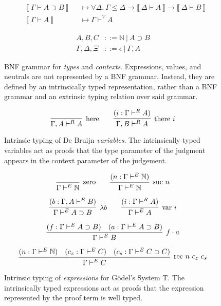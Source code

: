\documentclass[preprint,nonatbib]{sigplanconf}
\numberwithin{mysubdfn}{mydfn}
\def\dfn{\mapsto}
\def\arr{\supset}
\def\marr{\rightarrow}
\def\app{\cdot}
\def\lam{\lambda}
\def\nat{\mathbb{N}}
\newcommand{\el}[1]{\llbracket ~ #1 ~ \rrbracket}
\newcommand{\con}[1]{\textmd{#1}}
\newcommand{\fun}[1]{\textmd{#1}}
\newcommand{\typm}[1]{\el{\Gamma \vdash #1}}
\newcommand{\dtypm}[1]{\el{\Delta \vdash #1}}
\newcommand{\type}[1]{\Gamma \vdash^E #1}
\newcommand{\ctype}[2]{\Gamma , #1 \vdash^E #2}
\newcommand{\typv}[1]{\Gamma \vdash^V #1}
\newcommand{\dtypv}[1]{\Delta \vdash^V #1}
\newcommand{\typr}[1]{\Gamma \vdash^R #1}
\newcommand{\ctypr}[2]{\Gamma , #1 \vdash^R #2}
\newcommand{\ren}[1]{\Gamma \le #1}
\def\dren{\ren{\Delta}}
\newcommand{\env}[1]{\Gamma \sqsubseteq #1}
\def\denv{\env{\Delta}}
\begin{document}
\begin{align*}
&\typm{A \arr B}& &\dfn \forall \Delta.~ \dren \marr \dtypm{A} \marr \dtypm{B} \\
&\typm{A}& &\dfn \typv{A}
\end{align*}






\begin{figure}
\caption{
BNF grammar for {\it types} and {\it contexts}. 
Expressions, values, and neutrals
are not represented by a BNF grammar. Instead, they are defined by
an intrinsically typed representation, rather than a BNF grammar and
an extrinsic typing relation over said grammar.
}
\begin{align*}
A, B, C &::= \nat ~ | ~ A \arr B \\
\Gamma, \Delta, \Xi &::= \epsilon ~ | ~ \Gamma , A
\end{align*}
\label{fig:gram}
\end{figure}

\begin{figure}
\caption{
Intrinsic typing of De Bruijn {\it variables}.
The intrinsically typed variables act as proofs that the type
parameter of the judgment appears in the context parameter of the
judgement.
}
$$
\infer
  [\con{here}]
  {\ctypr{A}{A}}
{
}
\qquad
\infer
  [\con{there} ~ i]
  {\ctypr{B}{A}}
{
  (i : \typr{A})
}
$$
\label{fig:typr}
\end{figure}

\begin{figure}
\caption{
Intrinsic typing of {\it expressions} for G{\"o}del's System T. The
intrinsically typed expressions act as proofs that the expression
represented by the proof term is well typed.
}
$$
\infer
  [\con{zero}]
  {\type{\nat}}
{}
\qquad
\infer
  [\con{suc} ~ n]
  {\type{\nat}}
{
  (n : \type{\nat})
}
$$

$$
\infer
  [\lam b]
  {\type{A \arr B}}
{
  (b : \ctype{A}{B})
}
\qquad
\infer
  [\fun{var} ~ i]
  {\type{A}}
{
  (i : \typr{A})
}
$$

$$
\infer
  [f \app a]
  {\type{B}}
{
  (f : \type{A \arr B})
  &
  (a : \type{A \arr B})
}
$$

$$
\infer
  [\fun{rec} ~ n ~ c_z ~ c_s]
  {\type{C}}
{
  (n : \type{\nat})
  &
  (c_z : \type{C})
  &
  (c_s : \type{C \arr C})
}
$$
\label{fig:type}
\end{figure}
\end{document}
